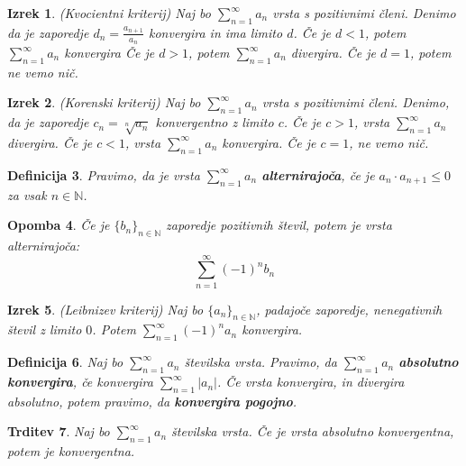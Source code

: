 \documentclass[11pt]{article}
\newtheorem{Izrek}{{\sc Izrek}}[section]
\newtheorem{Trditev}[Izrek]{{\sc Trditev}}
\newtheorem{Definicija}[Izrek]{{\sc Definicija}}
\newtheorem{Opomba}[Izrek]{{\sc Opomba}}
\begin{document}
\begin{Izrek}
	(Kvocientni kriterij) Naj bo $\sum_{n = 1}^{\infty}{a_n}$ vrsta s pozitivnimi členi. Denimo da je zaporedje $d_n = \frac{a_{n+1}}{a_n}$ konvergira in ima limito $d$.
	\newline
	Če je  $d < 1$, potem $\sum_{n = 1}^{\infty}{a_n}$ konvergira
	\newline
	Če je $d > 1$, potem $\sum_{n = 1}^{\infty}{a_n}$ divergira.
	\newline
	Če je $d = 1$, potem ne vemo nič.
\end{Izrek}
\begin{Izrek}
	(Korenski kriterij) Naj bo $\sum_{n = 1}^{\infty}{a_n}$ vrsta s pozitivnimi členi. Denimo, da je zaporedje $c_n =\sqrt[n]{a_n}$ konvergentno z limito $c$.
	\newline
	Če je $ c > 1$, vrsta $\sum_{n = 1}^{\infty}{a_n}$ divergira.
	\newline
	Če je $ c < 1$, vrsta $\sum_{n = 1}^{\infty}{a_n}$ konvergira.
	\newline
	Če je $c = 1$, ne vemo nič.
\end{Izrek}
\begin{Definicija}
	Pravimo, da je vrsta $\sum_{n = 1}^{\infty}{a_n}$ \textbf{alternirajoča}, če je $a_n \cdot a_{n+1} \le 0$ za vsak $n\in \mathbb{N}$.
\end{Definicija}
\begin{Opomba}
	Če je $\{b_n\}_{n\in \mathbb{N}}$ zaporedje pozitivnih števil, potem je vrsta alternirajoča:
	$$\sum_{n = 1}^{\infty}{(-1)^n b_n}$$
\end{Opomba}
\begin{Izrek}
	(Leibnizev kriterij) Naj bo $\{a_n\}_{n\in \mathbb{N}}$, padajoče zaporedje, nenegativnih števil z limito $0$. Potem $\sum_{n = 1}^{\infty}{(-1)^n a_n}$ konvergira.
\end{Izrek}
\begin{Definicija}
	Naj bo $\sum_{n = 1}^{\infty}{a_n}$ številska vrsta. Pravimo, da $\sum_{n = 1}^{\infty}{a_n}$ \textbf{absolutno konvergira}, če konvergira $\sum_{n = 1}^{\infty}{|a_n|}$. Če vrsta konvergira, in divergira absolutno, potem pravimo, da \textbf{konvergira pogojno}.
\end{Definicija}
\begin{Trditev}
	Naj bo $\sum_{n = 1}^{\infty}{a_n}$ številska vrsta. Če je vrsta absolutno konvergentna, potem je konvergentna.
\end{Trditev}

\end{document}

